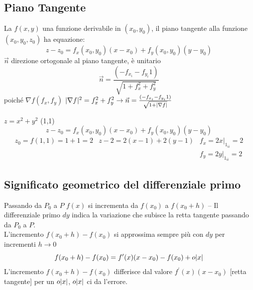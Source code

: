 \subsection{Piano Tangente}
La $f(x,y)$ una funzione derivabile in $(x_0,y_0)$, il piano tangente alla funzione $(x_0,y_0,z_0)$
ha equazione:
\begin{equation*}
  z-z_0=f_x(x_0,y_0)(x-x_0)+f_y(x_0,y_0)(y-y_0)
\end{equation*}
$\vec{n}$ direzione ortogonale al piano tangente, è unitario
\begin{equation*}
  \vec{n}=\frac{(-f_{x_i}-f_{y_i}1)}{\sqrt{1+f_x^2+f_y^2}}
\end{equation*}
poiché $\nabla f(f_x,f_y)$ $\lvert\nabla f\rvert^2=f_x^2+f_y^2\to \vec{n}=\frac{(-f_{x_i}-f_{y_i}1)}{\sqrt{1+\lvert\nabla f\rvert}}$
\begin{esempio}
  $z=x^2+y^2$ (1,1)
  \begin{equation*}
    z-z_0=f_x(x_0,y_0)(x-x_0)+f_y(x_0,y_0)(y-y_0)
  \end{equation*}
  \begin{equation*}
    \begin{matrix}
      z_0=f(1,1)=1+1=2 & z-2=2(x-1)+2(y-1) & f_x=2x|_{1_{ii}}=2\\
                       & & f_y=2y|_{1_{ii}}=2
    \end{matrix}
  \end{equation*}
\end{esempio}
\subsection{Significato geometrico del differenziale primo}
Passando da $P_0$ a $P$ $f(x)$ si incrementa da $f(x_0)$ a $f(x_0+h)$ -- Il differenziale primo $dy$
indica la variazione che subisce la retta tangente passando da $P_0$ a $P$.\\
L'incremento $f(x_0+h)-f(x_0)$ si approssima sempre più con $dy$ per incrementi $h\to 0$
\begin{equation*}
  f(x_0+h)-f(x_0)=f^\prime (x)(x-x_0)-f(x_0)+o\lvert x\rvert
\end{equation*}
L'incremento $f(x_0+h)-f(x_0)$ differisce dal valore $f^\prime (x)(x-x_0)$ [retta tangente] per un
$o\lvert x\rvert$, $o\lvert x\rvert$ ci da l'errore.
